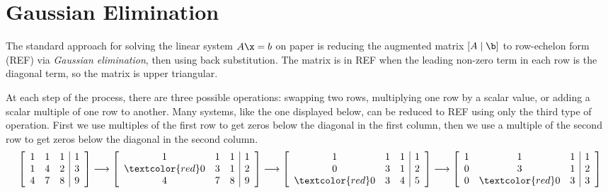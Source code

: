

\section*{Gaussian Elimination} %

The standard approach for solving the linear system $A\x = b$ on paper is reducing the augmented matrix $\left[A\mid\b\right]$ to row-echelon form (REF) via \emph{Gaussian elimination}, then using back substitution.
The matrix is in REF when the leading non-zero term in each row is the diagonal term, so the matrix is upper triangular.

At each step of the process, there are three possible operations: swapping two rows, multiplying one row by a scalar value, or adding a scalar multiple of one row to another.
Many systems, like the one displayed below, can be reduced to REF using only the third type of operation.
First we use multiples of the first row to get zeros below the diagonal in the first column, then we use a multiple of the second row to get zeros below the diagonal in the second column.
%
\begin{align*}
\left[\begin{array}{ccc|c}
1 & 1 & 1 & 1 \\
1 & 4 & 2 & 3 \\
4 & 7 & 8 & 9 \\
\end{array}\right]
\longrightarrow
\left[\begin{array}{ccc|c}
1 & 1 & 1 & 1 \\
\textcolor{red}0 & 3 & 1 & 2 \\
4 & 7 & 8 & 9 \\
\end{array}\right]
\longrightarrow
\left[\begin{array}{ccc|c}
1 & 1 & 1 & 1 \\
0 & 3 & 1 & 2 \\
\textcolor{red}0 & 3 & 4 & 5 \\
\end{array}\right]
\longrightarrow
\left[\begin{array}{ccc|c}
1 & 1 & 1 & 1 \\
0 & 3 & 1 & 2 \\
0 & \textcolor{red}0 & 3 & 3
\end{array}\right]
\end{align*}

